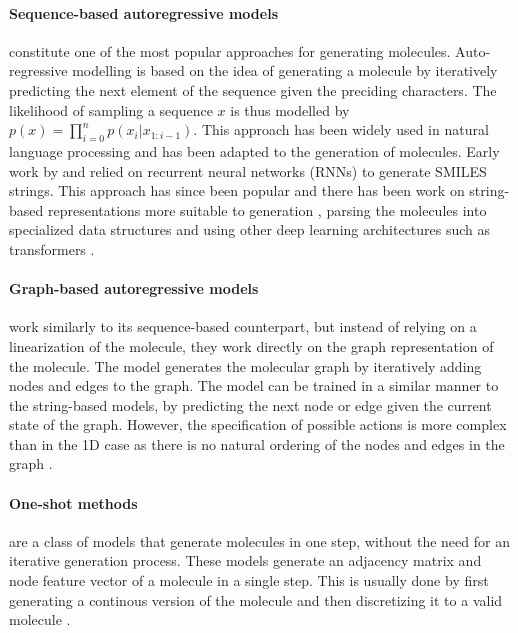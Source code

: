 \paragraph{Sequence-based autoregressive models} constitute one of the most popular approaches for
generating molecules. Auto-regressive modelling is based on the idea of
generating a molecule by iteratively predicting the next element of the sequence given the preciding
characters. The likelihood of sampling a sequence $x$ is thus modelled by $p(x) = \prod_{i=0}^n
      p(x_i | x_{1:i-1})$. This approach has been widely used in natural language processing and has been
adapted to the generation of molecules. Early work by \citep{seglerGeneratingFocusedMolecule2018} and
\citep{gomez-bombarelliAutomaticChemicalDesign2018} relied on recurrent neural networks (RNNs) to
generate SMILES strings. This approach has since been popular and there has been work on string-based
representations more suitable to generation
\citep{oboyleDeepSMILESAdaptationSMILES2018,krennSelfReferencingEmbeddedStrings2020,noutahiGottaBeSAFE2023}, parsing the
molecules into specialized data structures
\citep{kusnerGrammarVariationalAutoencoder2017,jinJunctionTreeVariational2018} and using other
deep learning architectures such as transformers
\citep{vaswaniAttentionAllYou2017,noutahiGottaBeSAFE2023,schwallerMolecularTransformerModel2019,bagalMolGPTMolecularGeneration2022,mazuzMoleculeGenerationUsing2023}.

\paragraph{Graph-based autoregressive models} work similarly to its sequence-based counterpart, but
instead of relying on a linearization of the molecule, they work directly on the graph representation
of the molecule. The model generates the molecular graph by iteratively adding nodes and edges to the
graph. The model can be trained in a similar manner to the string-based models, by
predicting the next node or edge given the current state of the graph. However, the specification of
possible actions is more complex than in the 1D case as there is no natural ordering of the
nodes and edges in the graph \citep{liuConstrainedGraphVariational2018,liLearningDeepGenerative2018,youGraphConvolutionalPolicy2019,cohen-karlikOvercomingOrderAutoregressive2024}.

\paragraph{One-shot methods} are a class of models that generate molecules in one step, without the
need for an iterative generation process. These models generate an adjacency matrix and node feature
vector of a molecule in a single step. This is usually done by first generating a continous version
of the molecule and then discretizing it to a valid molecule \citep{decaoMolGANImplicitGenerative2018,madhawaGraphNVPInvertibleFlow2019,kadurinCornucopiaMeaningfulLeads2016}.

